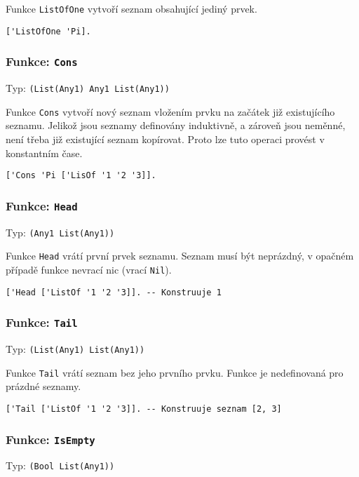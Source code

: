 Funkce \lstinline{ListOfOne} vytvoří seznam obsahující jediný prvek.

\begin{lstlisting}[caption={Ukázka využití ListOfOne}]
['ListOfOne 'Pi].
\end{lstlisting}

\subsubsection*{Funkce: \lstinline|Cons|}
Typ: \lstinline{(List(Any1) Any1 List(Any1))}

Funkce \lstinline{Cons} vytvoří nový seznam vložením prvku na začátek již existujícího seznamu.
Jelikož jsou seznamy definovány induktivně, a zároveň jsou neměnné, není třeba již existující seznam
kopírovat. Proto lze tuto operaci provést v konstantním čase.

\begin{lstlisting}[caption={Ukázka využití Cons}]
['Cons 'Pi ['LisOf '1 '2 '3]].
\end{lstlisting}

\subsubsection*{Funkce: \lstinline|Head|}
Typ: \lstinline{(Any1 List(Any1))}

Funkce \lstinline{Head} vrátí první prvek seznamu. Seznam musí být neprázdný, v opačném případě
funkce nevrací nic (vrací \lstinline{Nil}).

\begin{lstlisting}[caption={Ukázka využití Head}]
['Head ['ListOf '1 '2 '3]]. -- Konstruuje 1
\end{lstlisting}

\subsubsection*{Funkce: \lstinline|Tail|}
Typ: \lstinline{(List(Any1) List(Any1))}

Funkce \lstinline{Tail} vrátí seznam bez jeho prvního prvku. Funkce je nedefinovaná pro prázdné
seznamy.

\begin{lstlisting}[caption={Ukázka využití Head}]
['Tail ['ListOf '1 '2 '3]]. -- Konstruuje seznam [2, 3]
\end{lstlisting}

\subsubsection*{Funkce: \lstinline|IsEmpty|}
Typ: \lstinline{(Bool List(Any1))}

